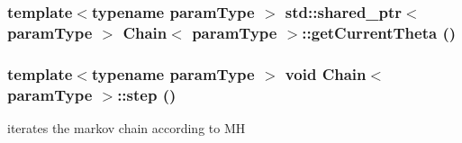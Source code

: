 \label{classChain_ae738aa544270ab0d3c8e3b03872e1cd0}
\hypertarget{classChain_a44e04b0bc061e651dec369b09b23c226}{
\subsubsection[{getCurrentTheta}]{\setlength{\rightskip}{0pt plus 5cm}template$<$typename paramType $>$ std::shared\_\-ptr$<$ paramType $>$ {\bf Chain}$<$ paramType $>$::getCurrentTheta ()}}
\label{classChain_a44e04b0bc061e651dec369b09b23c226}
\hypertarget{classChain_ad6c694578319523237aa7ee355e9d044}{
\subsubsection[{step}]{\setlength{\rightskip}{0pt plus 5cm}template$<$typename paramType $>$ void {\bf Chain}$<$ paramType $>$::step ()}}
\label{classChain_ad6c694578319523237aa7ee355e9d044}
iterates the markov chain according to MH 


